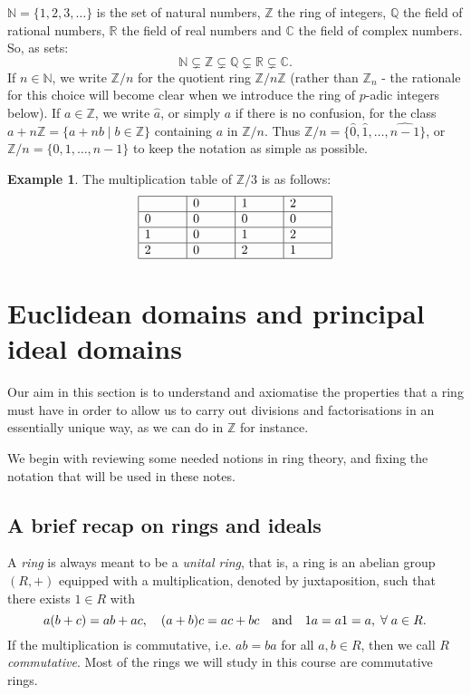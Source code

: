 \documentclass[12pt]{article}
\newcommand{\qbox}[1]{\quad\hbox{#1}\quad}
\theoremstyle{definition}
\newtheorem{example}[thm]{Example}
\newcounter{ex}\renewcommand\theex{\arabic{ex}}
\newcommand{\N}{\ensuremath{\mathbb{N}}}
\newcommand{\Z}{\ensuremath{\mathbb{Z}}}
\newcommand{\Q}{\ensuremath{\mathbb{Q}}}
\newcommand{\R}{\ensuremath{\mathbb{R}}}
\newcommand{\C}{\ensuremath{\mathbb{C}}}
\newcommand{\wh}[1]{\widehat{#1}}
\begin{document}

$\N=\{1,2,3,\dots\}$ is the set of natural numbers, $\Z$ the ring of
integers, $\Q$ the field of rational numbers, $\R$ the field of real
numbers and $\C$ the field of complex numbers. So, as sets:
$$\N\subsetneq\Z\subsetneq\Q\subsetneq\R\subsetneq\C.$$
If $n\in\N$, we write $\Z/n$  for the quotient ring $\Z/n\Z$ (rather
than $\Z_n$ - the rationale for this choice will become clear when we
introduce the ring of $p$-adic integers below).
If $a\in\Z$, we write $\wh a$, or simply $a$ if there is no
confusion, for the class $a+n\Z=\{a+nb\mid b\in\Z\}$ containing $a$ in
$\Z/n$. Thus $\Z/n=\{\wh0,\wh1,\dots,\wh{n-1}\}$, or 
$\Z/n=\{0,1,\dots,n-1\}$ to keep the notation as simple as possible.

\begin{example}
The multiplication table of $\Z/3$ is as follows:
$$\begin{array}{|p{1.0cm}|p{1.0cm}|p{1.0cm}|p{1.0cm}|}
\hline
&0&1&2\\
\hline
0&0&0&0\\
\hline
1&0&1&2\\
\hline
2&0&2&1\\
\hline
\end{array}$$
\end{example}



\section{Euclidean domains and principal ideal domains}\label{sec:ed}

Our aim in this section is to
understand and axiomatise the properties that a ring must have in
order to allow us to carry out divisions and factorisations in an
essentially unique way, as we can do in $\Z$ for instance.

We begin with reviewing some needed notions in ring theory, and fixing
the notation that will be used in these notes.

\subsection{A brief recap on rings and ideals}\label{ssec:recap}

A {\em ring} is always meant to be a {\em unital ring},
that is, a ring is an abelian group $(R,+)$ equipped with a
multiplication, denoted by juxtaposition, such that there exists
$1\in R$ with
$$a(b+c)=ab+ac,\quad(a+b)c=ac+bc\qbox{and}1a=a1=a,\;\forall\;a\in R.$$
If the multiplication is commutative, i.e. $ab=ba$ for all $a,b\in R$,
then we call $R$ {\em commutative}.
Most of the rings we will study in this course are commutative rings.
\end{document}
